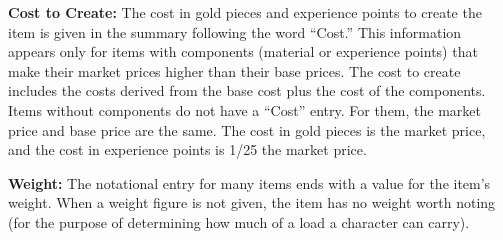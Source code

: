 \textbf{Cost to Create:} The cost in gold pieces and experience points to create the item is given in the summary following the word ``Cost.'' This information appears only for items with components (material or experience points) that make their market prices higher than their base prices. The cost to create includes the costs derived from the base cost plus the cost of the components. Items without components do not have a ``Cost'' entry. For them, the market price and base price are the same. The cost in gold pieces is \onehalf the market price, and the cost in experience points is 1/25 the market price.

\textbf{Weight:} The notational entry for many items ends with a value for the item's weight. When a weight figure is not given, the item has no weight worth noting (for the purpose of determining how much of a load a character can carry).
